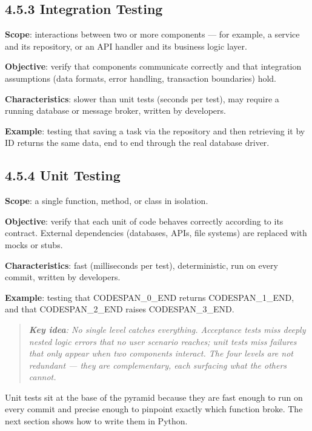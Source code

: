 \documentclass[11pt,a4paper]{book}
\begin{document}
\subsection{4.5.3 Integration Testing}

\textbf{Scope}: interactions between two or more components --- for example, a service and its repository, or an API handler and its business logic layer.

\textbf{Objective}: verify that components communicate correctly and that integration assumptions (data formats, error handling, transaction boundaries) hold.

\textbf{Characteristics}: slower than unit tests (seconds per test), may require a running database or message broker, written by developers.

\textbf{Example}: testing that saving a task via the repository and then retrieving it by ID returns the same data, end to end through the real database driver.

\subsection{4.5.4 Unit Testing}

\textbf{Scope}: a single function, method, or class in isolation.

\textbf{Objective}: verify that each unit of code behaves correctly according to its contract. External dependencies (databases, APIs, file systems) are replaced with mocks or stubs.

\textbf{Characteristics}: fast (milliseconds per test), deterministic, run on every commit, written by developers.

\textbf{Example}: testing that CODESPAN\_0\_END returns CODESPAN\_1\_END, and that CODESPAN\_2\_END raises CODESPAN\_3\_END.

\begin{quote}
\textit{\textbf{Key idea}: No single level catches everything. Acceptance tests miss deeply nested logic errors that no user scenario reaches; unit tests miss failures that only appear when two components interact. The four levels are not redundant --- they are complementary, each surfacing what the others cannot.}
\end{quote}

Unit tests sit at the base of the pyramid because they are fast enough to run on every commit and precise enough to pinpoint exactly which function broke. The next section shows how to write them in Python.
\end{document}

